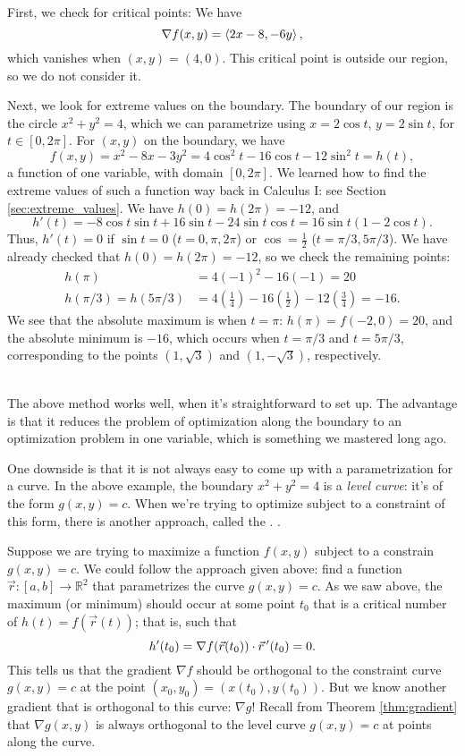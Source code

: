 {
First, we check for critical points: We have
\[
\nabla f(x,y) = \left\langle 2x-8,-6y\right\rangle,
\]
which vanishes when $(x,y) = (4,0)$. This critical point is outside our region, so we do not consider it.

Next, we look for extreme values on the boundary. The boundary of our region is the circle $x^2+y^2=4$, which we can parametrize using $x=2\cos t$, $y=2\sin t$, for $t\in [0,2\pi]$. For $(x,y)$ on the boundary, we have
\[
f(x,y) = x^2-8x-3y^2 = 4\cos^2t-16\cos t-12\sin^2t = h(t),
\]
a function of one variable, with domain $[0,2\pi]$. We learned how to find the extreme values of such a function way back in Calculus I: see Section \ref{sec:extreme_values}. We have $h(0)=h(2\pi)=-12$, and
\[
h'(t) = -8\cos t\sin t+16\sin t-24\sin t\cos t = 16\sin t (1-2\cos t).
\]
Thus, $h'(t)=0$ if $\sin t = 0$ ($t=0,\pi,2\pi$) or $\cos =\frac12$ ($t=\pi/3, 5\pi/3$). We have already checked that $h(0)=h(2\pi)=-12$, so we check the remaining points:
\begin{align*}
h(\pi) &= 4(-1)^2-16(-1) = 20\\
h(\pi/3)=h(5\pi/3) & = 4\left(\frac14\right)-16\left(\frac{1}{2}\right)-12\left(\frac34\right) = -16.
\end{align*}
We see that the absolute maximum is when $t=\pi$: $h(\pi) = f(-2,0)=20$, and the absolute minimum is $-16$, which occurs when $t=\pi/3$ and $t=5\pi/3$, corresponding to the points $(1,\sqrt{3})$ and $(1,-\sqrt{3})$, respectively. 
}\\

The above method works well, when it's straightforward to set up. The advantage is that it reduces the problem of optimization along the boundary to an optimization problem in one variable, which is something we mastered long ago.

One downside is that it is not always easy to come up with a parametrization for a curve. In the above example, the boundary $x^2+y^2=4$ is a \emph{level curve}: it's of the form $g(x,y)=c$. When we're trying to optimize subject to a constraint of this form, there is another approach, called the . .

Suppose we are trying to maximize a function $f(x,y)$ subject to a constrain $g(x,y)=c$. We could follow the approach given above: find a function $\vec{r}: [a,b]\to \mathbb{R}^2$ that parametrizes the curve $g(x,y)=c$. As we saw above, the maximum (or minimum) should occur at some point $t_0$ that is a critical number of $h(t)=f(\vec{r}(t))$; that is, such that 
\[
h'(t_0)=\nabla f(\vec{r}(t_0))\cdot \vec r\, ' (t_0) = 0.
\]
This tells us that the gradient $\nabla f$ should be orthogonal to the constraint curve $g(x,y)=c$ at the point $(x_0,y_0)=(x(t_0),y(t_0))$. But we know another gradient that is orthogonal to this curve: $\nabla g$! Recall from Theorem \ref{thm:gradient} that $\nabla g(x,y)$ is always orthogonal to the level curve $g(x,y)=c$ at points along the curve.


